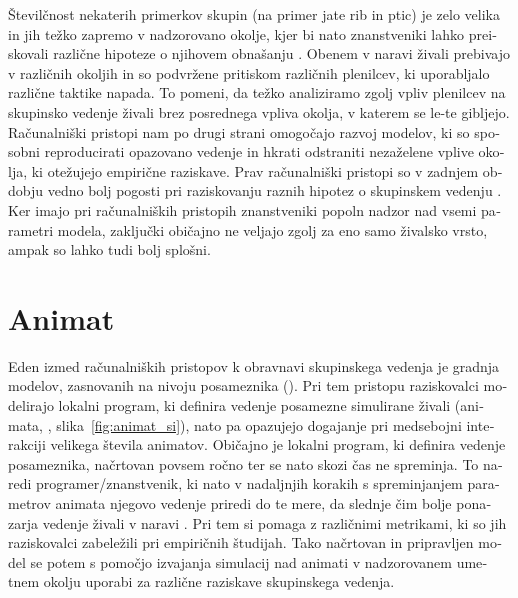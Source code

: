 \begin{slovenian}
Številčnost nekaterih primerkov skupin (na primer jate rib in ptic) je zelo velika in jih težko zapremo v nadzorovano okolje, kjer bi nato znanstveniki lahko preiskovali različne hipoteze o njihovem obnašanju \cite{lebarbajec2009organized}. Obenem v naravi živali prebivajo v različnih okoljih in so podvržene pritiskom različnih plenilcev, ki uporabljalo različne taktike napada. To pomeni, da težko analiziramo zgolj vpliv plenilcev na skupinsko vedenje živali brez posrednega vpliva okolja, v katerem se le-te gibljejo. Računalniški pristopi nam po drugi strani omogočajo razvoj modelov, ki so sposobni reproducirati opazovano vedenje in hkrati odstraniti nezaželene vplive okolja, ki otežujejo empirične raziskave. Prav računalniški pristopi so v zadnjem obdobju vedno bolj pogosti pri raziskovanju raznih hipotez o skupinskem vedenju \cite{vicsek1995novel,couzin2002collective,hildenbrandt2010selforganized}. Ker imajo pri računalniških pristopih znanstveniki popoln nadzor nad vsemi parametri modela, zaključki običajno ne veljajo zgolj za eno samo živalsko vrsto, ampak so lahko tudi bolj splošni.

\section{Animat}

Eden izmed računalniških pristopov k obravnavi skupinskega vedenja je gradnja modelov, zasnovanih na nivoju posameznika (). Pri tem pristopu raziskovalci modelirajo lokalni program, ki definira vedenje posamezne simulirane živali (animata,  \cite{cliff1993adding,fine2013unifying,lebarbajec2005fuzzy,watts1998animats,wilson1985knowledge}, slika~\ref{fig:animat_si}), nato pa opazujejo dogajanje pri medsebojni interakciji velikega števila animatov. Običajno je lokalni program, ki definira vedenje posameznika, načrtovan povsem ročno ter se nato skozi čas ne spreminja. To naredi programer/znanstvenik, ki nato v nadaljnjih korakih s spreminjanjem parametrov animata njegovo vedenje priredi do te mere, da slednje čim bolje ponazarja vedenje živali v naravi \cite{couzin2002collective,demsar2014simulated,demsar2015simulating,lebarbajec2005fuzzy,lebarbajec2005simulating,hildenbrandt2010selforganized,vicsek1995novel}. Pri tem si pomaga z različnimi metrikami, ki so jih raziskovalci zabeležili pri empiričnih študijah. Tako načrtovan in pripravljen model se potem s pomočjo izvajanja simulacij nad animati v nadzorovanem umetnem okolju uporabi za različne raziskave skupinskega vedenja. 


\end{slovenian}
